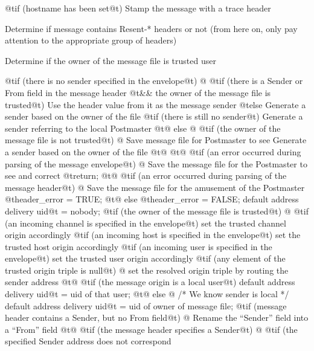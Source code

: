 {{{    @t{if (}hostname has been set@t{)}
        Stamp the message with a trace header

    Determine if message contains Resent-* headers or not
    (from here on, only pay attention to the appropriate group of headers)

    Determine if the owner of the message file is trusted user

    @t{if (}there is no sender specified in the envelope@t{) @{}
        @t{if (}there is a Sender or From field in the message header
            @t{&&} the owner of the message file is trusted@t{)}
            Use the header value from it as the message sender
        @t{else}
            Generate a sender based on the owner of the file
        @t{if (}there is still no sender@t{)}
            Generate a sender referring to the local Postmaster
    @t{@} else @{}
        @t{if (}the owner of the message file is not trusted@t{) @{}
            Save message file for Postmaster to see
            Generate a sender based on the owner of the file
        @t{@}}
    @t{@}}
    @t{if (}an error occurred during parsing of the message envelope@t{) @{}
        Save the message file for the Postmaster to see and correct
        @t{return;}
    @t{@}}
    @t{if (}an error occurred during parsing of the message header@t{) @{}
        Save the message file for the amusement of the Postmaster
        @t{header_error = TRUE;}
    @t{@} else}
        @t{header_error = FALSE;}
    default address delivery uid@t{ = nobody;}
    @t{if (}the owner of the message file is trusted@t{) @{}
        @t{if (}an incoming channel is specified in the envelope@t{)}
            set the trusted channel origin accordingly
        @t{if (}an incoming host is specified in the envelope@t{)}
            set the trusted host origin accordingly
        @t{if (}an incoming user is specified in the envelope@t{)}
            set the trusted user origin accordingly
        @t{if (}any element of the trusted origin triple is null@t{) @{}
            set the resolved origin triple by
                routing the sender address
        @t{@}}
        @t{if (}the message origin is a local user@t{)}
            default address delivery uid@t{ = uid of that user;}
    @t{@} else @{}
        /* We know sender is local */
        default address delivery uid@t{ = uid of owner of message file;}
        @t{if (}message header contains a Sender, but no From field@t{) @{}
            Rename the ``Sender'' field into a ``From'' field
        @t{@}}
        @t{if (}the message header specifies a Sender@t{) @{}
            @t{if (}the specified Sender address does not correspond
}}}}}
